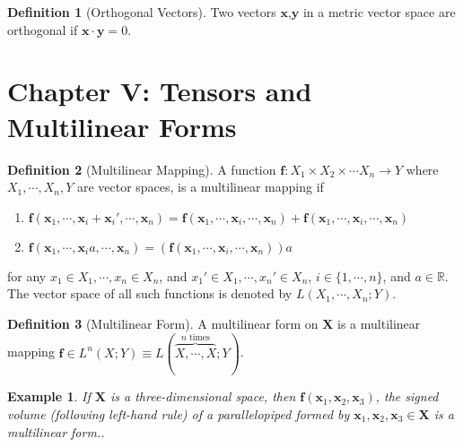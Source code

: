 \documentclass[letterpaper,12pt]{article}
\theoremstyle{plain}
\theoremstyle{plain}
\newtheorem{exmp}{Example}
\theoremstyle{definition}
\newtheorem{defn}{Definition}
\begin{document}
\begin{defn}[Orthogonal Vectors]\label{defortho}
Two vectors $\mathbf{x}$,$\mathbf{y}$ in a metric vector space are orthogonal if $\mathbf{x}\cdot\mathbf{y}=0$.
\end{defn}
\clearpage

\section{Chapter V: Tensors and Multilinear Forms}
\begin{defn}[Multilinear Mapping]\label{defmmap}
A function $\mathbf{f}:X_1 \times X_2 \times \cdots X_n \rightarrow Y$ where $X_1,\cdots,X_n,Y$ are vector spaces, is a multilinear mapping if
\begin{enumerate}
\item $\mathbf{f}(\mathbf{x}_1,\cdots,\mathbf{x}_i+\mathbf{x}_i',\cdots,\mathbf{x}_n) = \mathbf{f}(\mathbf{x}_1,\cdots,\mathbf{x}_i,\cdots,\mathbf{x}_n) + \mathbf{f}(\mathbf{x}_1,\cdots,\mathbf{x}_i,\cdots,\mathbf{x}_n)$
\item $\mathbf{f}(\mathbf{x}_1,\cdots,\mathbf{x}_ia,\cdots,\mathbf{x}_n) = \left( \mathbf{f}(\mathbf{x}_1,\cdots,\mathbf{x}_i,\cdots,\mathbf{x}_n) \right)a$
\end{enumerate}
for any $x_1\in X_1, \cdots, x_n\in X_n$, and $x_1'\in X_1, \cdots, x_n'\in X_n$, $i\in \{1,\cdots,n\}$, and $a\in \mathbb{R}$. The vector space of all such functions is denoted by $L(X_1,\cdots,X_n;Y)$.
\end{defn}
\begin{defn}[Multilinear Form]\label{defmform}
A multilinear form on $\mathbf{X}$ is a multilinear mapping $\mathbf{f}\in L^n(X;Y) \equiv L(\overbrace{X,\cdots,X}^{n \text{ times}};Y)$.
\end{defn}
\begin{exmp} If $\mathbf{X}$ is a three-dimensional space, then $\mathbf{f}(\mathbf{x}_1,\mathbf{x}_2,\mathbf{x}_3)$, the signed volume (following left-hand rule) of a parallelopiped formed by $\mathbf{x}_1,\mathbf{x}_2,\mathbf{x}_3\in\mathbf{X}$ is a multilinear form..
\end{exmp}
\end{document}
